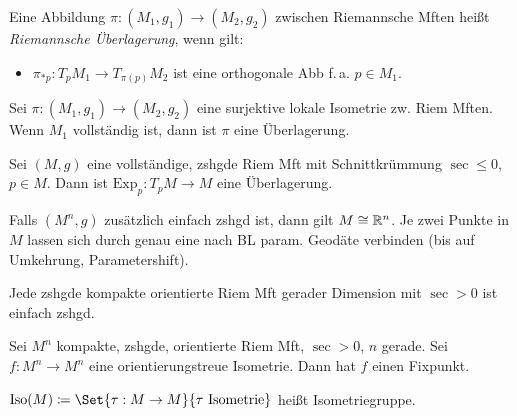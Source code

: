 \documentclass{cheat-sheet}
\newcommand{\Exp}{\mathrm{Exp}} %
\newcommand{\Iso}{\mathrm{Iso}} %
\begin{document}
\begin{defn}
  Eine Abbildung $\pi : (M_1, g_1) \to (M_2, g_2)$ zwischen Riemannsche Mften heißt \emph{Riemannsche Überlagerung}, wenn gilt:
  \begin{itemize}
    \item $\pi_{*p} : T_p M_1 \to T_{\pi(p)} M_2$ ist eine orthogonale Abb f.\,a. $p \in M_1$.
  \end{itemize}
\end{defn}

\begin{satz}
  Sei $\pi : (M_1, g_1) \to (M_2, g_2)$ eine surjektive lokale Isometrie zw. Riem Mften. Wenn $M_1$ vollständig ist, dann ist $\pi$ eine Überlagerung.
\end{satz}

\begin{satz}
  Sei $(M, g)$ eine vollständige, zshgde Riem Mft mit Schnittkrümmung $\sec \leq 0$, $p \in M$. Dann ist $\Exp_p : T_p M \to M$ eine Überlagerung.
\end{satz}


\begin{kor}
  Falls $(M^n, g)$ zusätzlich einfach zshgd ist, dann gilt $M \cong \mathbb{R}^n$.
  Je zwei Punkte in $M$ lassen sich durch genau eine nach BL param. Geodäte verbinden (bis auf Umkehrung, Parametershift).
\end{kor}


\begin{satz}
  Jede zshgde kompakte orientierte Riem Mft gerader Dimension mit $\sec > 0$ ist einfach zshgd.
\end{satz}

\begin{satz}
  Sei $M^n$ kompakte, zshgde, orientierte Riem Mft, $\sec > 0$, $n$ gerade. Sei $f : M^n \to M^n$ eine orientierungstreue Isometrie. Dann hat $f$ einen Fixpunkt.
\end{satz}



\begin{nota}
  $\Iso(M) \coloneqq \Set{ \tau : M \to M }{ \tau \text{ Isometrie} }$ heißt Isometriegruppe.
\end{nota}
\end{document}
